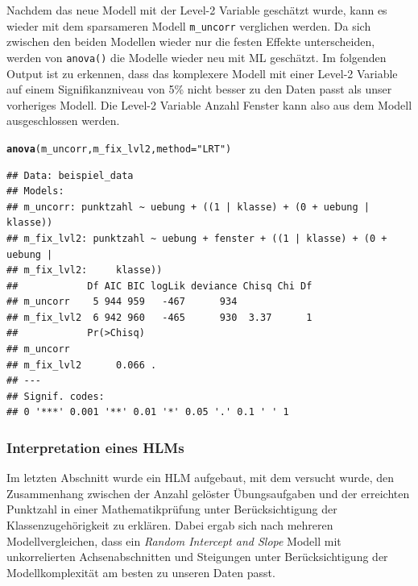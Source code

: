 \documentclass[12pt, a4paper]{article}\usepackage[]{graphicx}\usepackage[]{color}
\makeatletter
\newcommand{\hlstr}[1]{\textcolor[rgb]{0.192,0.494,0.8}{#1}}%
\newcommand{\hlstd}[1]{\textcolor[rgb]{0.345,0.345,0.345}{#1}}%
\newcommand{\hlkwc}[1]{\textcolor[rgb]{0.333,0.667,0.333}{#1}}%
\newcommand{\hlkwd}[1]{\textcolor[rgb]{0.737,0.353,0.396}{\textbf{#1}}}%
\newenvironment{kframe}{%
 \def\at@end@of@kframe{}%
 \ifinner\ifhmode%
  \def\at@end@of@kframe{\end{minipage}}%
  \begin{minipage}{\columnwidth}%
 \fi\fi%
 \def\FrameCommand##1{\hskip\@totalleftmargin \hskip-\fboxsep
 \colorbox{shadecolor}{##1}\hskip-\fboxsep
     \hskip-\linewidth \hskip-\@totalleftmargin \hskip\columnwidth}%
 \MakeFramed {\advance\hsize-\width
   \@totalleftmargin\z@ \linewidth\hsize
   \@setminipage}}%
 {\par\unskip\endMakeFramed%
 \at@end@of@kframe}
\newenvironment{knitrout}{}{} %
\makeatother
\begin{document}
Nachdem das neue Modell mit der Level-2 Variable geschätzt wurde, kann es wieder mit dem sparsameren Modell \texttt{m\_uncorr} verglichen werden. Da sich zwischen den beiden Modellen wieder nur die festen Effekte unterscheiden, werden von \texttt{anova()} die Modelle wieder neu mit ML geschätzt. Im folgenden Output ist zu erkennen, dass das komplexere Modell mit einer Level-2 Variable auf einem Signifikanzniveau von 5\% nicht besser zu den Daten passt als unser vorheriges Modell. Die Level-2 Variable Anzahl Fenster kann also aus dem Modell ausgeschlossen werden.

\singlespacing
\begin{knitrout}
\color{fgcolor}\begin{kframe}
\begin{alltt}
\hlkwd{anova}\hlstd{(m_uncorr, m_fix_lvl2,} \hlkwc{method} \hlstd{=} \hlstr{"LRT"}\hlstd{)}
\end{alltt}


{\ttfamily\noindent\itshape\color{messagecolor}{\#\# refitting model(s) with ML (instead of REML)}}\begin{verbatim}
## Data: beispiel_data
## Models:
## m_uncorr: punktzahl ~ uebung + ((1 | klasse) + (0 + uebung | klasse))
## m_fix_lvl2: punktzahl ~ uebung + fenster + ((1 | klasse) + (0 + uebung | 
## m_fix_lvl2:     klasse))
##            Df AIC BIC logLik deviance Chisq Chi Df
## m_uncorr    5 944 959   -467      934             
## m_fix_lvl2  6 942 960   -465      930  3.37      1
##            Pr(>Chisq)  
## m_uncorr               
## m_fix_lvl2      0.066 .
## ---
## Signif. codes:  
## 0 '***' 0.001 '**' 0.01 '*' 0.05 '.' 0.1 ' ' 1
\end{verbatim}
\end{kframe}
\end{knitrout}

\subsubsection{Interpretation eines HLMs}
Im letzten Abschnitt wurde ein HLM aufgebaut, mit dem versucht wurde, den Zusammenhang zwischen der Anzahl gelöster Übungsaufgaben und der erreichten Punktzahl in einer Mathematikprüfung unter Berücksichtigung der Klassenzugehörigkeit zu erklären. Dabei ergab sich nach mehreren Modellvergleichen, dass ein \textit{Random Intercept and Slope} Modell mit unkorrelierten Achsenabschnitten und Steigungen unter Berücksichtigung der Modellkomplexität am besten zu unseren Daten passt.
\end{document}
